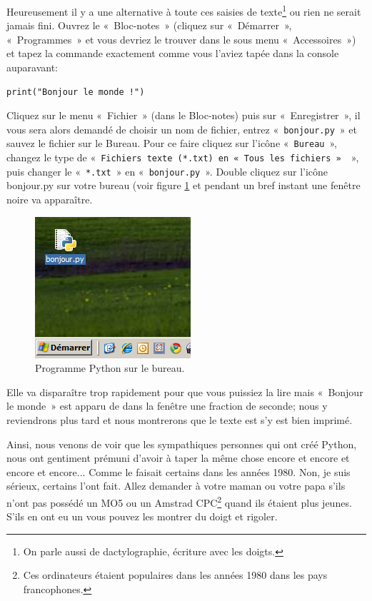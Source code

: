 Heureusement il y a une alternative à toute ces saisies de texte\footnote{On parle aussi de dactylographie, écriture avec les doigts.} ou rien ne serait jamais fini.
Ouvrez le «~Bloc-notes~» (cliquez sur «~Démarrer~», «~Programmes~» et vous devriez le trouver dans le sous menu «~Accessoires~») et tapez la commande exactement comme vous l'aviez tapée dans la console auparavant:

\begin{Verbatim}[frame=single,rulecolor=\color{gray}, label=ne pas saisir]
print("Bonjour le monde !")
\end{Verbatim}
\rm

Cliquez sur le menu «~Fichier~» (dans le Bloc-notes) puis sur «~Enregistrer~», il vous sera alors demandé de choisir un nom de fichier, entrez «~\texttt{bonjour.py}~» et sauvez le fichier sur le Bureau. Pour ce faire cliquez sur l'icône «~\texttt{Bureau}~», changez le type de «~\texttt{Fichiers texte (*.txt) en «~\texttt{Tous les fichiers}~» }~», puis changer le «~\texttt{*.txt}~» en «~\texttt{bonjour.py}~». Double cliquez sur l'icône bonjour.py sur votre bureau (voir figure \ref{fig:bureau} et pendant un bref instant une fenêtre noire va apparaître.

\begin{figure}[h!]
\centering
\includegraphics[scale=0.6]{images/bureau}
\caption{Programme Python sur le bureau.}\label{fig:bureau}
\end{figure}

Elle va disparaître trop rapidement pour que vous puissiez la lire mais «~Bonjour le monde~» est apparu de dans la fenêtre une fraction de seconde; nous y reviendrons plus tard et nous montrerons que le texte est s'y est bien imprimé.

Ainsi, nous venons de voir que les sympathiques personnes qui ont créé Python, nous ont gentiment prémuni d'avoir à taper la même chose encore et encore et encore et encore... Comme le faisait certains dans les années 1980. Non, je suis sérieux, certains l'ont fait. Allez demander à votre maman ou votre papa s'ils n'ont pas possédé un MO5 ou un Amstrad CPC\footnote{Ces ordinateurs étaient populaires dans les années 1980 dans les pays francophones.} quand ils étaient plus jeunes. S'ils en ont eu un vous pouvez les montrer du doigt et rigoler.\\


